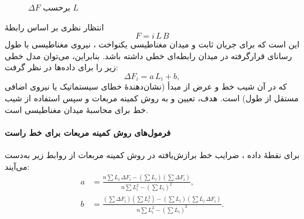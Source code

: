 \documentclass[a4paper, 11pt]{article}
\begin{document}
\begin{figure}[h]
\caption{{$\Delta F$ برحسب $L$}}
\label{fig:LF}
\centering
{}

\end{figure}

 انتظار نظری بر اساس رابطهٔ
\begin{equation}
F = i\,L\,B
\end{equation}
این است که برای جریان ثابت  و میدان مغناطیسی یکنواخت ، نیروی مغناطیسی با طول رسانای قرارگرفته در میدان رابطه‌ای خطی داشته باشد. بنابراین، می‌توان مدل خطی زیر را برای داده‌ها در نظر گرفت:
\begin{equation}
\Delta F_i = a\,L_i + b,
\end{equation}
که در آن  شیب خط و  عرض از مبدأ (نشان‌دهندهٔ خطای سیستماتیک یا نیروی اضافی مستقل از طول) است. هدف، تعیین  و  به روش کمینه مربعات و سپس استفاده از شیب خط برای محاسبهٔ میدان مغناطیسی  است.

\paragraph{فرمول‌های روش کمینه مربعات برای خط راست}
برای  نقطهٔ داده ، ضرایب خط برازش‌یافته  در روش کمینه مربعات از روابط زیر به‌دست می‌آیند:
\begin{align}
a &= \frac{n\sum L_i\,\Delta F_i - \left(\sum L_i\right)\left(\sum \Delta F_i\right)}
         {n\sum L_i^2 - \left(\sum L_i\right)^2}, \\
b &= \frac{\left(\sum \Delta F_i\right)\left(\sum L_i^2\right) - \left(\sum L_i\right)\left(\sum L_i\,\Delta F_i\right)}
         {n\sum L_i^2 - \left(\sum L_i\right)^2}.
\end{align}
\end{document}
